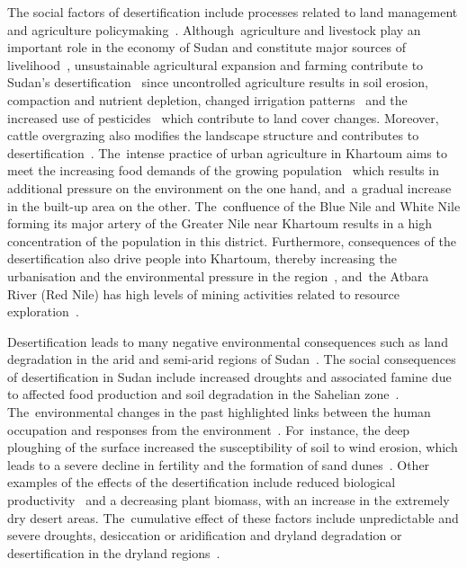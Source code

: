 \documentclass[jimaging,article,accept,pdftex,moreauthors]{Definitions/mdpi}
\begin{document}
The social factors of desertification include processes related to land management and agriculture policymaking~\cite{KOBAYASHI2020257}. Although~agriculture and livestock play an important role in the economy of Sudan and constitute major sources of livelihood~\cite{sulieman2010expansion}, unsustainable agricultural expansion and farming contribute to Sudan's desertification~\cite{Ibrahim} since uncontrolled agriculture results in soil erosion, compaction and nutrient depletion, changed irrigation patterns~\cite{AHMED2020106064} and the increased use of pesticides~\cite{Nesser} which contribute to land cover changes. Moreover, cattle overgrazing also modifies the landscape structure and contributes to desertification~\cite{Ahmed,Sulieman,Akhtar}. The~intense practice of urban agriculture in Khartoum aims to meet the increasing food demands of the growing population~\cite{SCHUMACHER2009399} which results in additional pressure on the environment on the one hand, and~a gradual increase in the built-up area on the other. The~confluence of the Blue Nile and White Nile forming its major artery of the Greater Nile near Khartoum results in a high concentration of the population in this district. Furthermore, consequences of the desertification also drive people into Khartoum, thereby increasing the urbanisation and the environmental pressure in the region~\cite{Babiker1982,Mohammed}, and~the Atbara River (Red Nile) has high levels of mining activities related to resource exploration~\cite{SASMAZ2020106539}. 

Desertification leads to many negative environmental consequences such as land degradation in the arid and semi-arid regions of Sudan~\cite{Khiry,ELNASHAR2022152925}. The social consequences of desertification in Sudan include increased droughts and associated famine due to affected food production and soil degradation in the Sahelian zone~\cite{Subramaniam}. The~environmental changes in the past highlighted links between the human occupation and responses from the environment~\cite{HONEGGER2015141}. For~instance, the deep ploughing of the surface increased the susceptibility of soil to wind erosion, which leads to a severe decline in fertility and the formation of sand dunes~\cite{Abdi}. Other examples of the effects of the desertification include reduced biological productivity~\cite{KHALIFA2018790,Jahelnabi} and a decreasing plant biomass, with an increase in the extremely dry desert areas. The~cumulative effect of these factors include unpredictable and severe droughts, desiccation or aridification and dryland degradation or desertification in the dryland regions~\cite{Darkoh}. 
\end{document}
